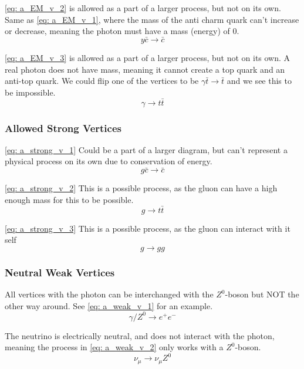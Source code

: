 \cref{eq: a_EM_v_2} is allowed as a part of a larger process, but not on its own. Same as \cref{eq: a_EM_v_1}, where the mass of the anti charm quark can't increase or decrease, meaning the photon must have a mass (energy) of 0. 
\begin{equation}\label{eq: a_EM_v_2}
y \bar{c} → \bar{c}
\end{equation}

\cref{eq: a_EM_v_3} is allowed as a part of a larger process, but not on its own. A real photon does not have mass, meaning it cannot create a top quark and an anti-top quark. We could flip one of the vertices to be $γ \bar{t} → \bar{t}$ and we see this to be impossible. 
\begin{equation}\label{eq: a_EM_v_3}
γ → t\bar{t}
\end{equation}

\subsubsection{Allowed Strong Vertices}
\cref{eq: a_strong_v_1} Could be a part of a larger diagram, but can't represent a physical process on its own due to conservation of energy. 
\begin{equation}\label{eq: a_strong_v_1}
  g \bar{c} → \bar{c}
\end{equation}

\cref{eq: a_strong_v_2} This is a possible process, as the gluon can have a high enough mass for this to be possible. 
\begin{equation}\label{eq: a_strong_v_2}
  g → t \bar{t}
\end{equation}

\cref{eq: a_strong_v_3} This is a possible process, as the gluon can interact with it self
\begin{equation}\label{eq: a_strong_v_3}
  g → g g
\end{equation}


\subsubsection{Neutral Weak Vertices}
All vertices with the photon can be interchanged with the $Z^{0}$-boson but NOT the other way around. See \cref{eq: a_weak_v_1} for an example.
\begin{equation}\label{eq: a_weak_v_1}
  γ / Z^{0} → e^{+} e^{-}  
\end{equation}

The neutrino is electrically neutral, and does not interact with the photon, meaning the process in \cref{eq: a_weak_v_2} only works with a $Z^{0}$-boson.
\begin{equation}\label{eq: a_weak_v_2}
  ν_{μ} → ν_{μ}Z^{0}
\end{equation}

